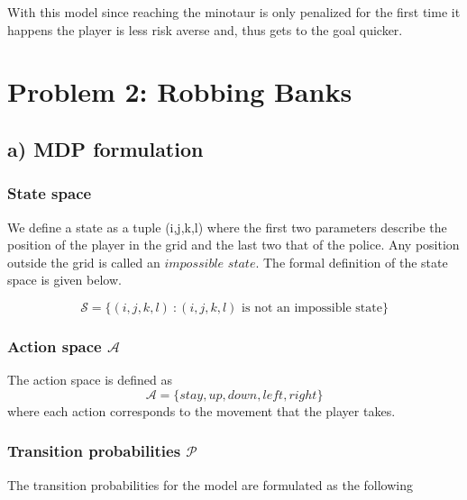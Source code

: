 \documentclass{article}
\begin{document}
With this model since reaching the minotaur is only penalized for the first time it happens the player is less risk averse and, thus gets to the goal quicker.


\section{Problem 2: Robbing Banks}
\subsection{a) MDP formulation}
\subsubsection{State space}
We define a state as a tuple (i,j,k,l) where the first two parameters describe the position of the player in the grid and the last two that of the police. Any position outside the grid is called an $impossible$ $state$. The formal definition of the state space is given below.

\begin{equation} 
\label{state_space_1}
\mathcal{S} = \Big\lbrace (i,j,k,l) ~:  (i,j, k, l) \textrm{ is not an impossible state}  \Big\rbrace
\end{equation}

\subsubsection{Action space $\mathcal{A}$}
The action space is defined as 
\begin{equation}
    \mathcal{A} = \{stay, up, down, left, right \}
\end{equation}
where each action corresponds to the movement that the player takes.
\subsubsection{Transition probabilities $\mathcal{P}$}
The transition probabilities for the model are formulated as the following
\end{document}
